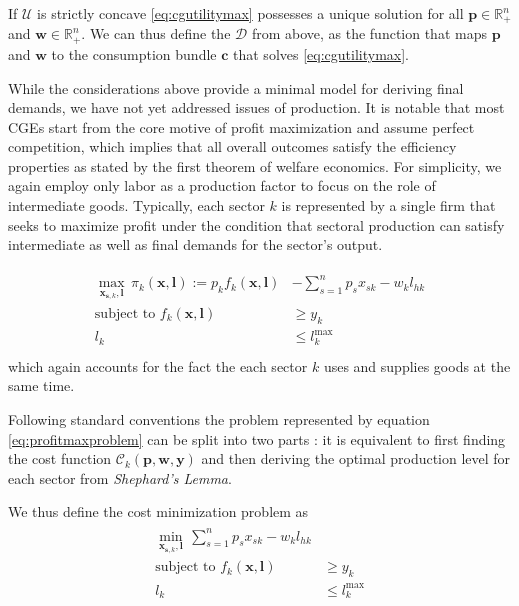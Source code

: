 \documentclass{article}
\newcommand{\costf}{\mathscr{C}}
\newcommand{\prices}{\mathbf{p}}
\newcommand{\quant}{\mathbf{y}}
\newcommand{\wages}{\mathbf{w}}
\newcommand{\cons}{\mathbf{c}}
\newcommand{\demandf}{\mathscr{D}}
\begin{document}
If $\mathcal U$ is strictly concave \eqref{eq:cgutilitymax} possesses a unique solution for all $\prices \in \mathbb R^n_+$ and $\wages \in \mathbb R^n_+$.
We can thus define the $\demandf$ from above, as the function that maps $\prices$ and $\wages$ to the consumption bundle $\cons$ that solves \eqref{eq:cgutilitymax}. 

While the considerations above provide a minimal model for deriving final demands, we have not yet addressed issues of production. 
It is notable that most CGEs start from the core motive of profit maximization and assume perfect competition, which implies that all overall outcomes satisfy the efficiency properties as stated by the first theorem of welfare economics. 
For simplicity, we again employ only labor as a production factor to focus on the role of intermediate goods. Typically, each sector $k$ is represented by a single firm that seeks to maximize profit under the condition that sectoral production can satisfy intermediate as well as final demands for the sector's output.

\begin{align}
  \label{eq:profitmaxproblem}
  \begin{split}
    \max_{\mathbf x_{\mathbf{s},k},\mathbf l}  \, \pi_{k}(\mathbf x,\mathbf l)  :=p_k f_k(\mathbf x,\mathbf l) &- \sum_{s = 1}^ n p_s x_{sk} - w_k l_{hk}  \\
  \text{subject to } f_k(\mathbf x, \mathbf l) &\geq y_k \\
  l_k &\leq  l^{\text{max}}_k\\
\end{split}
\end{align}
which again accounts for the fact the each sector $k$ uses and supplies goods at the same time. 

Following standard conventions the problem represented by equation \eqref{eq:profitmaxproblem} can be split into two parts \citep[][p.~146]{jehleAdvancedMicroeconomicTheory2011}:
it is equivalent to first finding the cost function $\costf_k(\prices,\wages,\quant)$ and then deriving the optimal production level for each sector from \textit{Shephard's Lemma}.

We thus define the cost minimization problem as 
\begin{align}
  \label{eq:pricemin}
  \begin{split}
    \min_{\mathbf x_{\mathbf{s},k},\mathbf l}  \, \sum_{s = 1}^ n p_s x_{sk} - w_k l_{hk}  \\
  \text{subject to } f_k(\mathbf x, \mathbf l) &\geq y_k \\
  l_k &\leq  l^{\text{max}}_k\\
\end{split}
\end{align}
\end{document}
